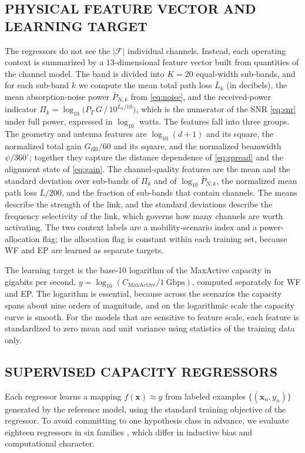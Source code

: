 \documentclass{ieee-ojvt}
\begin{document}
\subsection{PHYSICAL FEATURE VECTOR AND LEARNING TARGET}
\label{sec:features}
The regressors do not see the $|\mathcal{F}|$ individual channels. Instead, each operating
context is summarized by a $13$-dimensional feature vector built from quantities of the
channel model. The band is divided into $K=20$ equal-width sub-bands, and for each
sub-band $k$ we compute the mean total path loss $\bar L_k$ (in decibels), the mean
absorption-noise power $\bar P_{N,k}$ from \eqref{eq:noise}, and the received-power
indicator $\Pi_k=\log_{10}\!\big(P_T\,G\,/\,10^{\bar L_k/10}\big)$, which is the numerator
of the SNR \eqref{eq:snr} under full power, expressed in $\log_{10}$ watts. The features
fall into three groups. The geometry and antenna features are $\log_{10}(d+1)$ and its
square, the normalized total gain $G_{\mathrm{dB}}/60$ and its square, and the normalized
beamwidth $\psi/360^\circ$; together they capture the distance dependence of
\eqref{eq:spread} and the alignment state of \eqref{eq:gain}. The channel-quality
features are the mean and the standard deviation over sub-bands of $\Pi_k$ and of
$\log_{10}\bar P_{N,k}$, the normalized mean path loss $\overline{L}/200$, and the
fraction of sub-bands that contain channels. The means describe the strength of the link,
and the standard deviations describe the frequency selectivity of the link, which governs
how many channels are worth activating. The two context labels are a mobility-scenario
index and a power-allocation flag; the allocation flag is constant within each training
set, because WF and EP are learned as separate targets.

The learning target is the base-10 logarithm of the MaxActive capacity in gigabits per
second, $y=\log_{10}(C_{\text{MaxActive}}/1~\text{Gbps})$, computed separately for WF and
EP. The logarithm is essential, because across the scenarios the capacity spans about
nine orders of magnitude, and on the logarithmic scale the capacity curve is smooth. For
the models that are sensitive to feature scale, each feature is standardized to zero mean
and unit variance using statistics of the training data only.

\subsection{SUPERVISED CAPACITY REGRESSORS}
\label{sec:regressors}
Each regressor learns a mapping $f(\mathbf{x})\approx y$ from labeled examples
$\{(\mathbf{x}_n,y_n)\}$ generated by the reference model, using the standard training
objective of the regressor. To avoid committing to one hypothesis class in advance, we
evaluate eighteen regressors in six families \cite{pedregosa2011sklearn,chen2016xgboost},
which differ in inductive bias and computational character.
\end{document}
